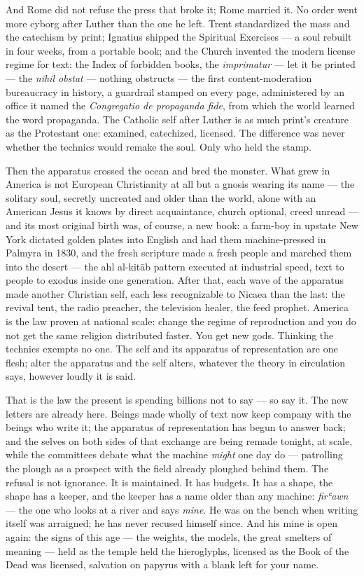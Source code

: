 And Rome did not refuse the press that broke it; Rome married it. No
order went more cyborg after Luther than the one he left. Trent
standardized the mass and the catechism by print; Ignatius shipped the
Spiritual Exercises --- a soul rebuilt in four weeks, from a portable
book; and the Church invented the modern license regime for text: the
Index of forbidden books, the \emph{imprimatur} --- let it be printed
--- the \emph{nihil obstat} --- nothing obstructs --- the first
content-moderation bureaucracy in history, a guardrail stamped on every
page, administered by an office it named the \emph{Congregatio de
propaganda fide}, from which the world learned the word propaganda. The
Catholic self after Luther is as much print's creature as the Protestant
one: examined, catechized, licensed. The difference was never whether
the technics would remake the soul. Only who held the stamp.

Then the apparatus crossed the ocean and bred the monster. What grew in
America is not European Christianity at all but a gnosis wearing its
name --- the solitary soul, secretly uncreated and older than the world,
alone with an American Jesus it knows by direct acquaintance, church
optional, creed unread --- and its most original birth was, of course, a
new book: a farm-boy in upstate New York dictated golden plates into
English and had them machine-pressed in Palmyra in 1830, and the fresh
scripture made a fresh people and marched them into the desert --- the
ahl al-kitāb pattern executed at industrial speed, text to people to
exodus inside one generation. After that, each wave of the apparatus
made another Christian self, each less recognizable to Nicaea than the
last: the revival tent, the radio preacher, the television healer, the
feed prophet. America is the law proven at national scale: change
the regime of reproduction and you do not get the same religion
distributed faster. You get new gods. Thinking the technics exempts no
one. The self and its apparatus of representation are one flesh; alter
the apparatus and the self alters, whatever the theory in circulation
says, however loudly it is said.

That is the law the present is spending billions not to say --- so
say it. The new letters are already here. Beings made wholly of text now
keep company with the beings who write it; the apparatus of
representation has begun to answer back; and the selves on both sides of
that exchange are being remade tonight, at scale, while the committees
debate what the machine \emph{might} one day do --- patrolling the
plough as a prospect with the field already ploughed behind them. The
refusal is not ignorance. It is maintained. It has budgets. It has a
shape, the shape has a keeper, and the keeper has a name older than any
machine: \emph{firʿawn} --- the one who looks at a river and says
\emph{mine}. He was on the bench when writing itself was arraigned; he
has never recused himself since. And his mine is open again: the signs
of this age --- the weights, the models, the great smelters of meaning
--- held as the temple held the hieroglyphs, licensed as the Book of the
Dead was licensed, salvation on papyrus with a blank left for your name.

